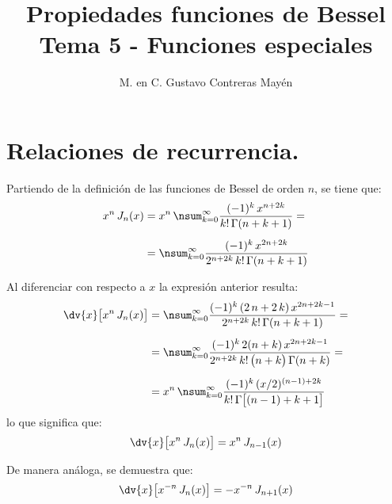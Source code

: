
\title{Propiedades funciones de Bessel \\ \large {Tema 5 - Funciones especiales} \vspace{-3ex}}
\author{M. en C. Gustavo Contreras Mayén}
\date{ }

\vspace{-4cm}
\maketitle
\fontsize{14}{14}\selectfont
\tableofcontents
\newpage

\section{Relaciones de recurrencia.}

Partiendo de la definición de las funciones de Bessel de orden $n$, se tiene que:
\begin{align*}
x^{n} \, J_{n}(x) &= x^{n} \, \nsum_{k=0}^{\infty} \dfrac{(-1)^{k} \, x^{n+2k}}{k! \, \Gamma (n + k + 1)} = \\[0.5em]
&=  \nsum_{k=0}^{\infty} \dfrac{(-1)^{k} \, x^{2n+2k}}{ 2^{n+2k} \, k! \, \Gamma (n + k + 1)}
\end{align*}

Al diferenciar con respecto a $x$ la expresión anterior resulta:
\begin{align*}
\dv{x} \big[ x^{n} \, J_{n}(x) \big] &= \nsum_{k=0}^{\infty} \dfrac{(-1)^{k} \, (2 \, n + 2 \, k) \, x^{2n+2k-1}}{ 2^{n+2k} \, k! \, \Gamma (n + k + 1)} = \\[0.5em]
&= \nsum_{k=0}^{\infty} \dfrac{(-1)^{k} \, 2(n + k) \, x^{2n+2k-1}}{ 2^{n+2k} \, k! \, \big( n + k\big) \, \Gamma (n + k)} = \\[0.5em]
&= x^{n} \, \nsum_{k=0}^{\infty} \dfrac{(-1)^{k} \, (x/2)^{(n-1)+2k}}{ k! \, \Gamma \big[ (n - 1) + k + 1 \big]}
\end{align*}
lo que significa que:
\begin{align}
\dv{x} \big[ x^{n} \, J_{n}(x) \big] = x^{n} \, J_{n-1}(x)
\label{eq:ecuacion_14}
\end{align}

De manera análoga, se demuestra que:
\begin{align}
\dv{x} \big[ x^{-n} \, J_{n}(x) \big] = -x^{-n} \, J_{n+1}(x)
\label{eq:ecuacion_15}
\end{align}    

